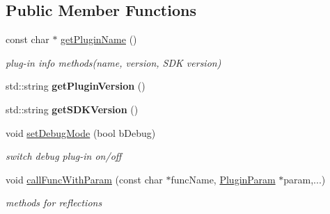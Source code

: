 \subsection*{Public Member Functions}
\begin{DoxyCompactItemize}
\item 
\mbox{\label{classcocos2d_1_1plugin_1_1PluginProtocol_a926be32b4faa5cedf8d47297762bf7ed}} 
const char $\ast$ \hyperlink{classcocos2d_1_1plugin_1_1PluginProtocol_a926be32b4faa5cedf8d47297762bf7ed}{get\+Plugin\+Name} ()
\begin{DoxyCompactList}\small\item\em plug-\/in info methods(name, version, S\+D\+K version) \end{DoxyCompactList}\item 
\mbox{\label{classcocos2d_1_1plugin_1_1PluginProtocol_a50a1f566e583612797afe727b416c031}} 
std\+::string {\bfseries get\+Plugin\+Version} ()
\item 
\mbox{\label{classcocos2d_1_1plugin_1_1PluginProtocol_a942005935236f2e17907a3255301081e}} 
std\+::string {\bfseries get\+S\+D\+K\+Version} ()
\item 
\mbox{\label{classcocos2d_1_1plugin_1_1PluginProtocol_a76dfc3b31979ecff00d132d00103865d}} 
void \hyperlink{classcocos2d_1_1plugin_1_1PluginProtocol_a76dfc3b31979ecff00d132d00103865d}{set\+Debug\+Mode} (bool b\+Debug)
\begin{DoxyCompactList}\small\item\em switch debug plug-\/in on/off \end{DoxyCompactList}\item 
\mbox{\label{classcocos2d_1_1plugin_1_1PluginProtocol_a9432b93d3f6e6756e3b5812a46d00a27}} 
void \hyperlink{classcocos2d_1_1plugin_1_1PluginProtocol_a9432b93d3f6e6756e3b5812a46d00a27}{call\+Func\+With\+Param} (const char $\ast$func\+Name, \hyperlink{classcocos2d_1_1plugin_1_1PluginParam}{Plugin\+Param} $\ast$param,...)
\begin{DoxyCompactList}\small\item\em methods for reflections \end{DoxyCompactList}\item 

\end{DoxyCompactItemize}
